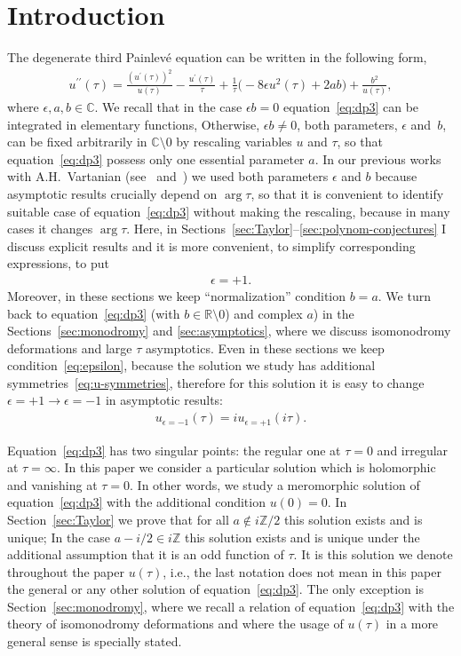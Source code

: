 \documentclass[pdftex]{sigma}
\numberwithin{equation}{section}
\begin{document}
\section{Introduction}\label{sec:Introduction}
The degenerate third Painlev\'{e} equation can be written in the following form,
\begin{gather}\label{eq:dp3}
u^{\prime \prime}(\tau) =\frac{(u^{\prime}(\tau))^{2}}{u(\tau)} - \frac{u^{\prime}(\tau)}{\tau} + \frac{1}{\tau}\big({-}8 \epsilon u^{2}(\tau) + 2ab\big) + \frac{b^{2}}{u(\tau)},
\end{gather}
where $\epsilon,a,b \in \mathbb{C}$. We recall that in the case $\epsilon b=0$ equation~\eqref{eq:dp3} can be integrated in elementary functions,
Otherwise, $\epsilon b\neq0$, both parameters, $\epsilon$ and~$b$, can be fixed arbitrarily in $\mathbb C{\setminus}0$
by rescaling variables $u$ and $\tau$, so that equation~\eqref{eq:dp3} possess only one essential parameter $a$.
In our previous works with A.H.~Vartanian (see~\cite{KV2004} and~\cite{KV2010}) we used both parameters
$\epsilon$ and $b$ because asymptotic results crucially depend on $\arg\tau$, so that it is convenient to identify
suitable case of equation~\eqref{eq:dp3} without making the rescaling, because in many cases it changes $\arg\tau$.
Here, in Sections~\ref{sec:Taylor}--\ref{sec:polynom-conjectures} I discuss explicit results and it is more
convenient, to simplify corresponding expressions, to put
\begin{gather}\label{eq:epsilon}
\epsilon=+1.
\end{gather}
Moreover, in these sections we keep ``normalization'' condition $b=a$. We turn back to equation~\eqref{eq:dp3}
(with $b\in\mathbb R{\setminus}0$) and complex $a$) in the Sections~\ref{sec:monodromy} and \ref{sec:asymptotics},
where we discuss isomonodromy deformations and large $\tau$ asymptotics. Even in these sections we keep
condition~\eqref{eq:epsilon}, because the solution we study has additional symmetries~\eqref{eq:u-symmetries},
therefore for this solution it is easy to change $\epsilon=+1\to\epsilon=-1$ in asymptotic results:
\begin{gather*}
u_{\epsilon=-1}(\tau)=iu_{\epsilon=+1}(i\tau).
\end{gather*}

Equation~\eqref{eq:dp3} has two singular points: the regular one at $\tau=0$ and irregular at $\tau=\infty$.
In this paper we consider a particular solution which is holomorphic and vanishing at $\tau=0$. In other words,
we study a meromorphic solution of equation~\eqref{eq:dp3} with the additional condition $u(0)=0$.
In Section~\ref{sec:Taylor} we prove that for all $a\notin i\mathbb Z/2$ this solution exists and is unique;
In the case $a-i/2\in i\mathbb Z$ this solution exists and is unique under the additional assumption that it is
an odd function of $\tau$.
It is this solution we denote throughout the paper $u(\tau)$, i.e., the last notation does not mean in this
paper the general or any other solution of equation~\eqref{eq:dp3}. The only exception is
Section~\ref{sec:monodromy}, where we recall a relation of equation~\eqref{eq:dp3} with the theory
of isomonodromy deformations and where the usage of $u(\tau)$ in a more general sense is specially stated.
\end{document}
